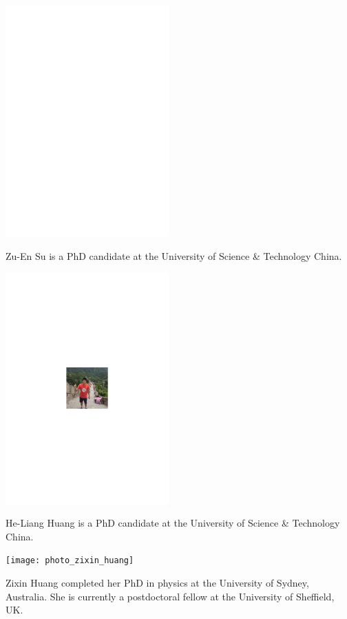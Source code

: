 \begin{center}
\includegraphics[width=0.47\textwidth]{photo_zuen_su}
\end{center}

Zu-En Su is a PhD candidate at the University of Science \& Technology China.


\begin{center}
\includegraphics[width=0.47\textwidth]{photo_heliang_huang}
\end{center}

He-Liang Huang is a PhD candidate at the University of Science \& Technology China.

\begin{center}
\texttt{[image: photo\_zixin\_huang]}
\end{center}

Zixin Huang completed her PhD in physics at the University of Sydney, Australia. She is currently a postdoctoral fellow at the University of Sheffield, UK.

